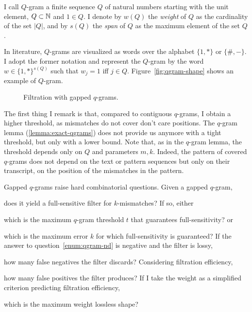 \begin{definition}
I call $Q$-gram a finite sequence $Q$ of natural numbers starting with the unit element, \ie $Q \subset \mathbb {N}$ and $1 \in Q$.
I denote by $w(Q)$ the \emph{weight} of $Q$ as the cardinality of the set $|Q|$, and by $s(Q)$ the \emph{span} of $Q$ as the maximum element of the set $Q$.
\end{definition}

In literature, $Q$-grams are visualized as words over the alphabet $\{1,*\}$ or $\{\#,-\}$.
I adopt the former notation and represent the $Q$-gram by the word $w \in \{1,*\}^{s(Q)}$ such that $w_j=1$ iff $j \in Q$.
Figure~\ref{fig:qgram-shape} shows an example of $Q$-gram.

\begin{figure}[h]
\begin{center}
\caption[Filtration with gapped $q$-grams]{Filtration with gapped $q$-grams.}
\label{fig:qgrams-gapped}

\end{center}
\end{figure}

The first thing I remark is that, compared to contiguous $q$-grams, I obtain a higher threshold, as mismatches do not cover don't care positions.
The $q$-gram lemma (\ref{lemma:exact-qgrams}) does not provide us anymore with a tight threshold, but only with a lower bound.
Note that, as in the $q$-gram lemma, the threshold depends only on $Q$ and parameters $m,k$.
Indeed, the pattern of covered $q$-grams does not depend on the text or pattern sequences but only on their transcript, \ie on the position of the mismatches in the pattern.


Gapped $q$-grams raise hard combinatorial questions. Given a gapped $q$-gram, 
\begin{inparaenum}[(i)]
\item \label{enum:qgram-non-detection} does it yield a full-sensitive filter for $k$-mismatches? If so, either
\item \label{enum:qgram-threshold} which is the maximum $q$-gram threshold $t$ that guarantees full-sensitivity? or 
\item \label{enum:qgram-error} which is the maximum error $k$ for which full-sensitivity is guaranteed?
If the answer to question~\ref{enum:qgram-nd} is negative and the filter is lossy,
\item \label{enum:qgram-fn} how many false negatives the filter discards?
Considering filtration efficiency,
\item \label{enum:qgram-fp} how many false positives the filter produces?
If I take the weight as a simplified criterion predicting filtration efficiency, 
\item \label{enum:qgram-weight} which is the maximum weight lossless shape?
\end{inparaenum}

